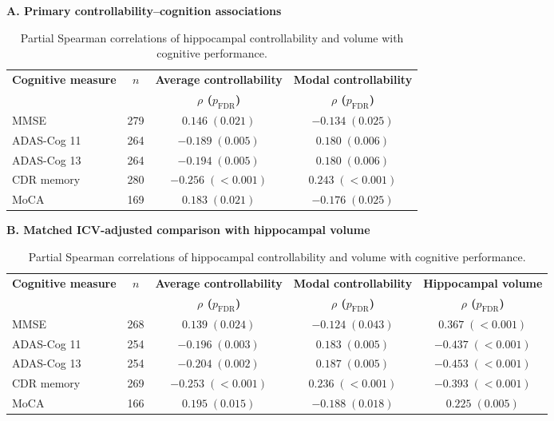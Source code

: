 \documentclass{article}
\begin{document}
\begin{table}[!htbp]
\centering
\caption{Partial Spearman correlations of hippocampal controllability and volume with cognitive performance.}
\label{tab:tableS4}
\footnotesize
\setlength{\tabcolsep}{3pt}

\textbf{A. Primary controllability--cognition associations}

\vspace{1mm}
\begin{tabular}{@{}lccc@{}}
\toprule
\textbf{Cognitive measure} & \textbf{$n$} & \textbf{Average controllability} & \textbf{Modal controllability}\\
 & & \textbf{$\rho$ ($p_{\mathrm{FDR}}$)} & \textbf{$\rho$ ($p_{\mathrm{FDR}}$)}\\
\midrule
MMSE & 279 & \(0.146\;(0.021)\) & \(-0.134\;(0.025)\) \\
ADAS-Cog 11 & 264 & \(-0.189\;(0.005)\) & \(0.180\;(0.006)\) \\
ADAS-Cog 13 & 264 & \(-0.194\;(0.005)\) & \(0.180\;(0.006)\) \\
CDR memory & 280 & \(-0.256\;(<0.001)\) & \(0.243\;(<0.001)\) \\
MoCA & 169 & \(0.183\;(0.021)\) & \(-0.176\;(0.025)\) \\
\bottomrule
\end{tabular}

\vspace{3mm}
\textbf{B. Matched ICV-adjusted comparison with hippocampal volume}

\vspace{1mm}
\begin{tabular}{@{}lcccc@{}}
\toprule
\textbf{Cognitive measure} & \textbf{$n$} & \textbf{Average controllability} & \textbf{Modal controllability} & \textbf{Hippocampal volume}\\
 & & \textbf{$\rho$ ($p_{\mathrm{FDR}}$)} & \textbf{$\rho$ ($p_{\mathrm{FDR}}$)} & \textbf{$\rho$ ($p_{\mathrm{FDR}}$)}\\
\midrule
MMSE & 268 & \(0.139\;(0.024)\) & \(-0.124\;(0.043)\) & \(0.367\;(<0.001)\) \\
ADAS-Cog 11 & 254 & \(-0.196\;(0.003)\) & \(0.183\;(0.005)\) & \(-0.437\;(<0.001)\) \\
ADAS-Cog 13 & 254 & \(-0.204\;(0.002)\) & \(0.187\;(0.005)\) & \(-0.453\;(<0.001)\) \\
CDR memory & 269 & \(-0.253\;(<0.001)\) & \(0.236\;(<0.001)\) & \(-0.393\;(<0.001)\) \\
MoCA & 166 & \(0.195\;(0.015)\) & \(-0.188\;(0.018)\) & \(0.225\;(0.005)\) \\
\bottomrule
\end{tabular}


\end{table}
\end{document}
